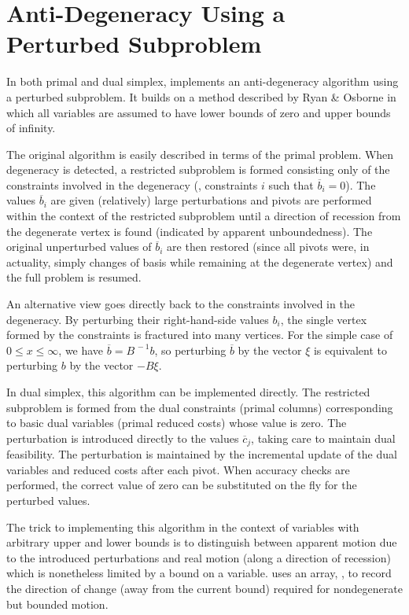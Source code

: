 \section{Anti-Degeneracy Using a Perturbed Subproblem}
\label{sec:PerturbedAntiDegeneracy}

In both primal and dual simplex, \dylp implements an anti-degeneracy
algorithm using a perturbed subproblem.
It builds on a method described by Ryan \& Osborne \cite{Rya88}
in which all variables are assumed to have lower bounds
of zero and upper bounds of infinity.

The original algorithm is easily described in terms of the primal problem.
When degeneracy is detected, a restricted subproblem is formed consisting only
of the constraints involved in the degeneracy (\ie, constraints $i$ such that
$\overline{b}_i = 0$).
The values $\overline{b}_i$ are given (relatively) large perturbations and
pivots are performed within the context of the restricted subproblem until a
direction of recession from the degenerate vertex is found (indicated by
apparent unboundedness).
The original unperturbed values of $\overline{b}_i$ are then restored (since
all pivots were, in actuality, simply changes of basis while remaining at the
degenerate vertex) and the full problem is resumed.

An alternative view goes directly back to the constraints involved in
the degeneracy.
By perturbing their right-hand-side values $b_i$, the single vertex formed by
the constraints is fractured into many vertices.
For the simple case of $0 \leq x \leq \infty$, we have
$\overline{b} = B^{\,-1} b$, so perturbing $\overline{b}$ by the vector
$\xi$ is equivalent to perturbing $b$ by the vector $-B\xi$.

In dual simplex, this algorithm can be implemented directly.
The restricted subproblem is formed from the dual constraints (primal columns)
corresponding to basic dual variables (primal reduced costs) whose value
is zero.
The perturbation is introduced directly to the values $\overline{c}_j$,
taking care to maintain dual feasibility.
The perturbation is maintained by the incremental update of the dual variables
and reduced costs after each pivot.
When accuracy checks are performed, the correct value of zero can be
substituted on the fly for the perturbed values.

The trick to implementing this algorithm in the context of variables with
arbitrary upper and lower bounds is to distinguish between apparent motion
due to the introduced perturbations and real motion (along a direction of
recession) which is nonetheless limited by a bound on a variable.
\dylp uses an array, , to record the direction of
change (away from the current bound) required for nondegenerate but
bounded motion.

